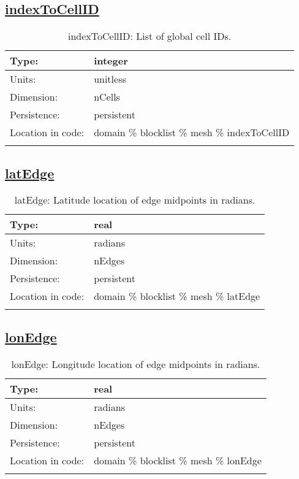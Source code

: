 \subsection[indexToCellID]{\hyperref[sec:var_tab_mesh]{indexToCellID}}
\label{subsec:var_sec_mesh_indexToCellID}
\begin{center}
\begin{longtable}{| p{2.0in} | p{4.0in} |}
        \hline 
        Type: & integer \\
        \hline 
        Units: & \si{unitless} \\
        \hline 
        Dimension: & nCells \\
        \hline 
        Persistence: & persistent \\
        \hline 
         Location in code: & domain \% blocklist \% mesh \% indexToCellID \\
         \hline 
    \caption{indexToCellID: List of global cell IDs.}
\end{longtable}
\end{center}
\subsection[latEdge]{\hyperref[sec:var_tab_mesh]{latEdge}}
\label{subsec:var_sec_mesh_latEdge}
\begin{center}
\begin{longtable}{| p{2.0in} | p{4.0in} |}
        \hline 
        Type: & real \\
        \hline 
        Units: & \si{radians} \\
        \hline 
        Dimension: & nEdges \\
        \hline 
        Persistence: & persistent \\
        \hline 
         Location in code: & domain \% blocklist \% mesh \% latEdge \\
         \hline 
    \caption{latEdge: Latitude location of edge midpoints in radians.}
\end{longtable}
\end{center}
\subsection[lonEdge]{\hyperref[sec:var_tab_mesh]{lonEdge}}
\label{subsec:var_sec_mesh_lonEdge}
\begin{center}
\begin{longtable}{| p{2.0in} | p{4.0in} |}
        \hline 
        Type: & real \\
        \hline 
        Units: & \si{radians} \\
        \hline 
        Dimension: & nEdges \\
        \hline 
        Persistence: & persistent \\
        \hline 
         Location in code: & domain \% blocklist \% mesh \% lonEdge \\
         \hline 
    \caption{lonEdge: Longitude location of edge midpoints in radians.}
\end{longtable}
\end{center}
